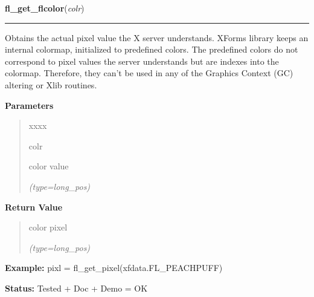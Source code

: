     \vspace{0.5ex}

\hspace{.8\funcindent}\begin{boxedminipage}{\funcwidth}

    \raggedright \textbf{fl\_get\_flcolor}(\textit{colr})

    \vspace{-1.5ex}

    \rule{\textwidth}{0.5\fboxrule}
\setlength{\parskip}{2ex}
    Obtains the actual pixel value the X server understands. XForms library
    keeps an internal colormap, initialized to predefined colors. The 
    predefined colors do not correspond to pixel values the server 
    understands but are indexes into the colormap. Therefore, they can't be
    used in any of the Graphics Context (GC) altering or Xlib routines.

\setlength{\parskip}{1ex}
      \textbf{Parameters}
      \vspace{-1ex}

      \begin{quote}
        \begin{Ventry}{xxxx}

          \item[colr]

          color value

            {\it (type=long\_pos)}

        \end{Ventry}

      \end{quote}

      \textbf{Return Value}
    \vspace{-1ex}

      \begin{quote}
      color pixel

      {\it (type=long\_pos)}

      \end{quote}

\textbf{Example:} pixl = fl\_get\_pixel(xfdata.FL\_PEACHPUFF)



\textbf{Status:} Tested + Doc + Demo = OK



    \end{boxedminipage}

    \label{xformslib:flbasic:fl_get_icm_color}

